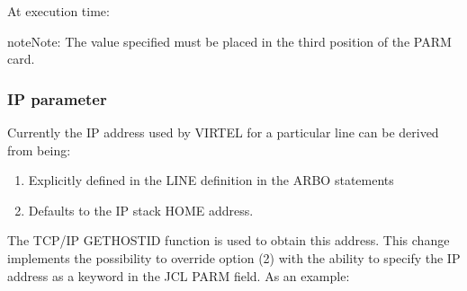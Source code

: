 \documentclass[letterpaper,10pt,english]{sphinxmanual}
\begin{document}
\sphinxAtStartPar
At execution time:

\begin{sphinxVerbatim}[commandchars=\\\{\}]
         
            
   
       
         
\end{sphinxVerbatim}

\begin{sphinxadmonition}{note}{Note:}
\sphinxAtStartPar
The value specified must be placed in the third position of the PARM card.
\end{sphinxadmonition}

\ignorespaces 

\subsubsection{IP parameter}
\label{\detokenize{Installation_Guide:ip-parameter}}\label{\detokenize{Installation_Guide:index-14}}
\sphinxAtStartPar
Currently the IP address used by VIRTEL for a particular line can be derived from being:\sphinxhyphen{}
\begin{enumerate}
%
\item {} 
\sphinxAtStartPar
Explicitly defined in the LINE definition in the ARBO statements

\item {} 
\sphinxAtStartPar
Defaults to the IP stack HOME address.

\end{enumerate}

\sphinxAtStartPar
The TCP/IP GETHOSTID function is used to obtain this address. This change implements the possibility to override
option (2) with the ability to specify the IP address as a keyword in the JCL PARM field. As an example:\sphinxhyphen{}
\end{document}
